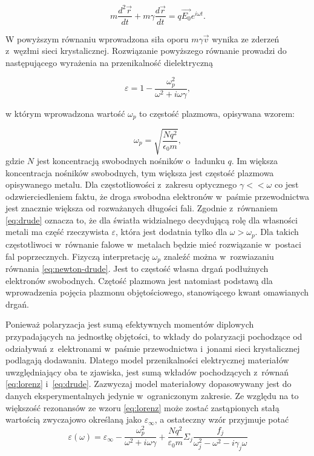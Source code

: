 \begin{equation}
m \frac{d^2\vec{r}}{dt} + m \gamma \frac{d\vec{r}}{dt} = q \vec{E_0}e^{i\omega t}.
\label{eq:newton-drude}
\end{equation}

W powyższym równaniu wprowadzona siła oporu $m \gamma \vec{v}$ wynika ze zderzeń z~węzłmi sieci krystalicznej. Rozwiązanie powyższego równanie prowadzi do następującego wyrażenia na przenikalność dielektryczną

\begin{equation}
\varepsilon= 1 - \frac{\omega_p^2}{\omega^2+i\omega \gamma},
\label{eq:drude}
\end{equation}

w którym wprowadzona wartość $\omega_p$ to częstość plazmowa, opisywana wzorem:

\begin{equation}
\omega_p = \sqrt{\frac{N q^2}{\epsilon_0 m}},
\label{eq:omega-plazmowa}
\end{equation}
gdzie $N$ jest koncentracją swobodnych nośników o~ładunku $q$. Im większa koncentracja nośników swobodnych, tym większa jest częstość plazmowa opisywanego metalu.  Dla częstotliowości z~zakresu optycznego $\gamma<<\omega$ co jest odzwierciedleniem faktu, że droga swobodna elektronów w~paśmie przewodnictwa jest znacznie większa od rozważanych długości fali. Zgodnie z~równaniem  \ref{eq:drude} oznacza to, że dla światła widzialnego decydującą rolę dla własności metali ma część rzeczywista $\varepsilon$, która jest dodatnia tylko dla $\omega>\omega_p$. Dla takich częstotliwoci w~równanie falowe w~metalach będzie mieć rozwiązanie w~postaci fal poprzecznych. Fizyczą interpretację $\omega_p$ znaleźć można w~rozwiazaniu równania \ref{eq:newton-drude}. Jest to częstość własna drgań podłużnych elektronów swobodnych. Czętość plazmowa jest natomiast podstawą dla wprowadzenia pojęcia plazmonu objętościowego, stanowiącego kwant omawianych drgań.

Ponieważ polaryzacja jest sumą efektywnych momentów diplowych przypadających na jednostkę objętości, to wkłady do polaryzacji pochodzące od odziaływań z~elektronami w~paśmie przewodnictwa i~jonami sieci krystalicznej podlagają dodawaniu. Dlatego model przenikalności elektrycznej materiałów uwzględniający oba te zjawiska, jest sumą wkładów pochodzących z~równań \ref{eq:lorenz} i~\ref{eq:drude}. Zazwyczaj model materiałowy dopasowywany jest do danych eksperymentalnych jedynie w~ograniczonym zakresie. Ze względu na to większość rezonansów ze wzoru \ref{eq:lorenz} może zostać zastąpionych stałą wartością zwyczajowo określaną jako $\varepsilon_\infty$, a ostateczny wzór przyjmuje potać
\begin{equation}
\varepsilon(\omega)=\varepsilon_\infty- \frac{\omega_p^2}{\omega^2+i\omega\gamma} +\frac{Nq^2}{\varepsilon_0 m} \Sigma_j \frac{f_j}{\omega_j^2-\omega^2-i\gamma_j\omega}
\label{eq:lorenz-drude}
\end{equation}
